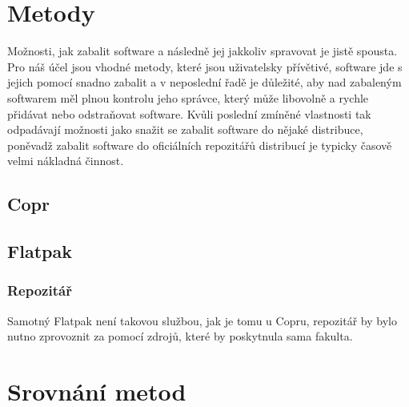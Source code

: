 \documentclass[
  digital,     %
  oneside,     %
  nosansbold,  %
  nocolorbold, %
  lof,         %
  lot,         %
]{fithesis4}
\begin{document}


\chapter{Metody}

Možnosti, jak zabalit software a následně jej jakkoliv spravovat je
jistě spousta. Pro náš účel jsou vhodné metody, které jsou uživatelsky
přívětivé, software jde s jejich pomocí snadno zabalit a v neposlední řadě
je důležité, aby nad zabaleným softwarem měl plnou kontrolu jeho správce,
který může libovolně a rychle přidávat nebo odstraňovat software. Kvůli poslední
zmíněné vlastnosti tak odpadávají možnosti jako snažit se zabalit software
do nějaké distribuce, poněvadž zabalit software do oficiálních repozitářů
distribucí je typicky časově velmi nákladná činnost.


\section{Copr}


\section{Flatpak}


\subsection{Repozitář}

Samotný Flatpak není takovou službou, jak je tomu u Copru, repozitář by bylo
nutno zprovoznit za pomocí zdrojů, které by poskytnula sama fakulta.




\chapter{Srovnání metod}
\end{document}
